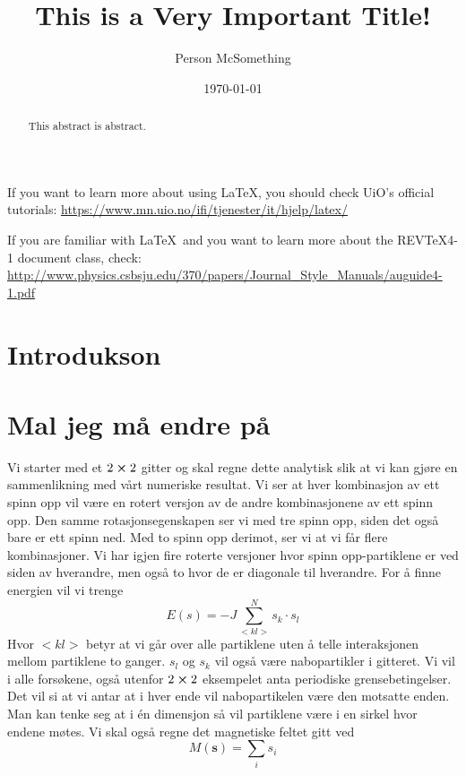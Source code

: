 \documentclass[reprint,english,notitlepage]{revtex4-2}  %
\begin{document}
\title{This is a Very Important Title!}   %
\author{Person McSomething}               %
\date{\today}                             %
\noaffiliation                            %
\begin{abstract}                          %
This abstract is abstract.                %
\end{abstract}                            %
\maketitle                                %

If you want to learn more about using \LaTeX, you should check UiO's official tutorials:
\url{https://www.mn.uio.no/ifi/tjenester/it/hjelp/latex/}

If you are familiar with \LaTeX\ and you want to learn more about the REVTeX4-1 document class, check:
\url{http://www.physics.csbsju.edu/370/papers/Journal_Style_Manuals/auguide4-1.pdf}


\section{Introdukson}

\section{Mal jeg må endre på}
Vi starter med et $2\cross 2$ gitter og skal regne dette analytisk slik at vi kan gjøre en sammenlikning med vårt numeriske resultat. Vi ser at hver kombinasjon av ett spinn opp vil være en rotert versjon av de andre kombinasjonene av ett spinn opp. Den samme rotasjonsegenskapen ser vi med tre spinn opp, siden det også bare er ett spinn ned. Med to spinn opp derimot, ser vi at vi får flere kombinasjoner. Vi har igjen fire roterte versjoner hvor spinn opp-partiklene er ved siden av hverandre, men også to hvor de er diagonale til hverandre.
For å finne energien vil vi trenge
$$
E(s)=-J\sum_{<kl>}^N s_k \cdot s_l
$$
Hvor $<kl>$ betyr at vi går over alle partiklene uten å telle interaksjonen mellom partiklene to ganger. $s_l$ og $s_k$ vil også være nabopartikler i gitteret. Vi vil i alle forsøkene, også utenfor $2\cross 2$ eksempelet anta periodiske grensebetingelser. Det vil si at vi antar at i hver ende vil nabopartikelen være den motsatte enden. Man kan tenke seg at i én dimensjon så vil partiklene være i en sirkel hvor endene møtes.
\newline 
Vi skal også regne det magnetiske feltet gitt ved
$$
M(\mathbf{s})=\sum_i s_i
$$
\end{document}

